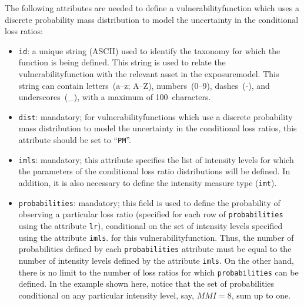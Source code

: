 \inputminted[firstline=24,firstnumber=24,lastline=33,fontsize=\footnotesize,frame=single,linenos,bgcolor=lightgray]{xml}{oqum/risk/verbatim/input_vulnerability.xml}

The following attributes are needed to define a \gls{vulnerabilityfunction}
which uses a discrete probability mass distribution to model the uncertainty
in the conditional loss ratios:

\begin{itemize}

  \item \Verb+id+: a unique string (ASCII) used to identify the \gls{taxonomy} for 
    which the function is being defined. This string is used to relate the 
    \gls{vulnerabilityfunction} with the relevant \gls{asset} in the 
    \gls{exposuremodel}. This string can contain letters~(a--z; A--Z), 
    numbers~(0--9), dashes~(-), and underscores~(\_), with a maximum of
    100~characters.

  \item \Verb+dist+: mandatory; for \glspl{vulnerabilityfunction} which use a 
    discrete probability mass distribution to model the uncertainty in the
    conditional loss ratios, this attribute should be set to ``\Verb+PM+''.

  \item \Verb+imls+: mandatory; this attribute specifies the list of intensity levels
    for which the parameters of the conditional loss ratio distributions will
    be defined. In addition, it is also necessary to define the intensity 
    measure type (\Verb+imt+).

  \item \Verb+probabilities+: mandatory; this field is used to define the
    probability of observing a particular loss ratio (specified for each row of
    \Verb+probabilities+ using the attribute \Verb+lr+), conditional on the set
    of intensity levels specified using the attribute \Verb+imls+.
    for this \gls{vulnerabilityfunction}. Thus, the number of probabilities
    defined by each \Verb+probabilities+ attribute must be equal to the number
    of intensity levels defined by the attribute \Verb+imls+. On the other hand,
    there is no limit to the number of loss ratios for which
    \Verb+probabilities+ can be defined. In the example shown here, notice that
    the set of probabilities conditional on any particular intensity level,
    say, $MMI = 8$, sum up to one.

\end{itemize}


